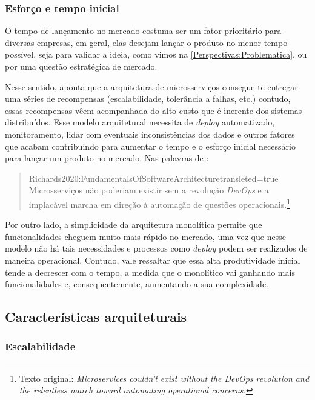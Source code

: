 \subsubsection{Esforço e tempo inicial}
\label{effortsAndTime}

O tempo de lançamento no mercado costuma ser um fator prioritário para diversas empresas, em geral,
elas desejam lançar o produto no menor tempo possível, seja para validar a ideia, como
vimos na \autoref{Perspectivas:Problematica}, ou por uma questão estratégica de mercado.

Nesse sentido,  aponta que a arquitetura de
microsserviços consegue te entregar uma séries de recompensas (escalabilidade, tolerância a falhas,
etc.) contudo, essas recompensas vêem acompanhada do alto custo que é inerente dos sistemas distribuídos.
Esse modelo arquitetural necessita de \textit{deploy} automatizado, monitoramento, lidar com
eventuais inconsistências dos dados e outros fatores que acabam contribuindo para aumentar o tempo e o esforço
inicial necessário para lançar um produto no mercado. Nas palavras de
:

\begin{quotation}{Richards2020:FundamentalsOfSoftwareArchitecture}{transleted=true}
    Microsserviços não poderiam existir sem a revolução \textit{DevOps} e a implacável marcha em direção à
    automação de questões operacionais.\footnote{Texto original: \textit{Microservices couldn't exist
    without the DevOps revolution and the relentless march toward automating operational concerns.}}
\end{quotation}

Por outro lado, a simplicidade da arquitetura monolítica permite que funcionalidades cheguem muito
mais rápido no mercado, uma vez que nesse modelo não há tais necessidades e processos como
\textit{deploy} podem ser realizados de maneira operacional. Contudo, vale ressaltar que essa alta
produtividade inicial tende a decrescer com o tempo, a medida que o monolítico vai ganhando mais
funcionalidades e, consequentemente, aumentando a sua complexidade.

\subsection{Características arquiteturais}

\subsubsection{Escalabilidade}
\label{pers:escalabilidade}

